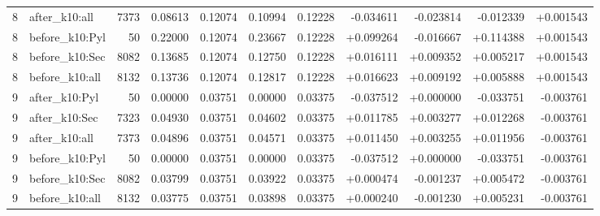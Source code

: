 \begin{longtable}{r l r r r r r r r r r}
8 & after\_k10:all & 7373 & 0.08613 & 0.12074 & 0.10994 & 0.12228 & -0.034611 & -0.023814 & -0.012339 & +0.001543 \\
8 & before\_k10:Pyl & 50 & 0.22000 & 0.12074 & 0.23667 & 0.12228 & +0.099264 & -0.016667 & +0.114388 & +0.001543 \\
8 & before\_k10:Sec & 8082 & 0.13685 & 0.12074 & 0.12750 & 0.12228 & +0.016111 & +0.009352 & +0.005217 & +0.001543 \\
8 & before\_k10:all & 8132 & 0.13736 & 0.12074 & 0.12817 & 0.12228 & +0.016623 & +0.009192 & +0.005888 & +0.001543 \\
9 & after\_k10:Pyl & 50 & 0.00000 & 0.03751 & 0.00000 & 0.03375 & -0.037512 & +0.000000 & -0.033751 & -0.003761 \\
9 & after\_k10:Sec & 7323 & 0.04930 & 0.03751 & 0.04602 & 0.03375 & +0.011785 & +0.003277 & +0.012268 & -0.003761 \\
9 & after\_k10:all & 7373 & 0.04896 & 0.03751 & 0.04571 & 0.03375 & +0.011450 & +0.003255 & +0.011956 & -0.003761 \\
9 & before\_k10:Pyl & 50 & 0.00000 & 0.03751 & 0.00000 & 0.03375 & -0.037512 & +0.000000 & -0.033751 & -0.003761 \\
9 & before\_k10:Sec & 8082 & 0.03799 & 0.03751 & 0.03922 & 0.03375 & +0.000474 & -0.001237 & +0.005472 & -0.003761 \\
9 & before\_k10:all & 8132 & 0.03775 & 0.03751 & 0.03898 & 0.03375 & +0.000240 & -0.001230 & +0.005231 & -0.003761 \\
\bottomrule
\end{longtable}
\endgroup

